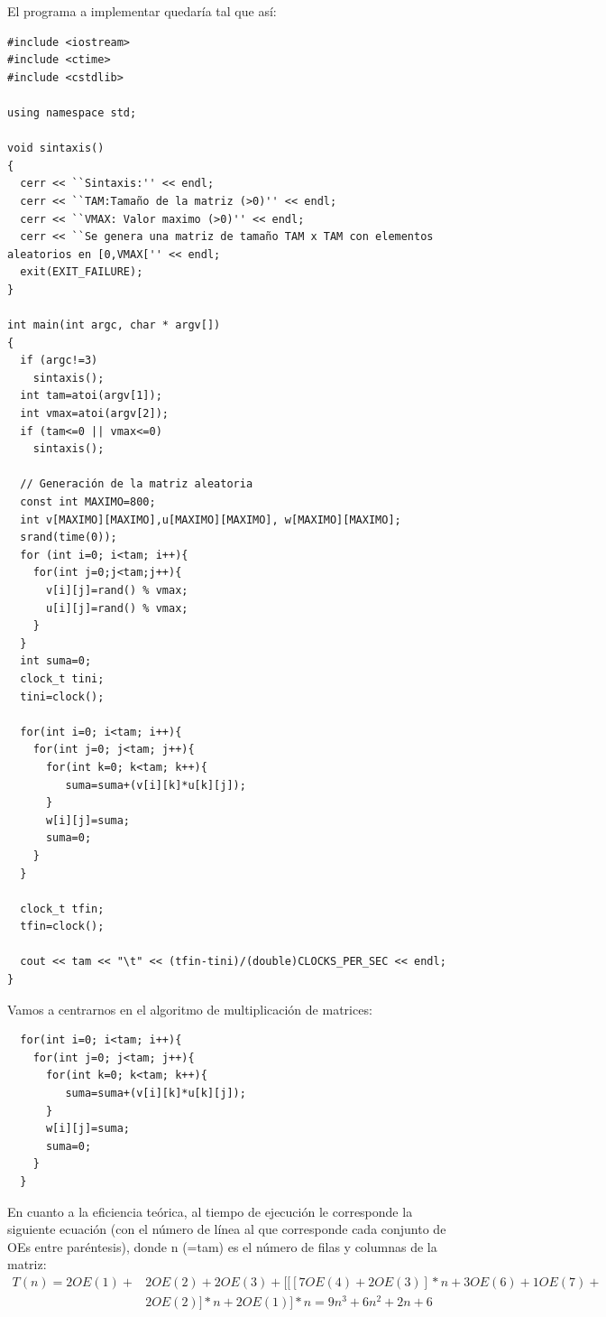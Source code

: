 \documentclass{article}
\begin{document}
El programa a implementar quedaría tal que así:
\begin{lstlisting}
#include <iostream>
#include <ctime>    
#include <cstdlib>  

using namespace std;

void sintaxis()
{
  cerr << ``Sintaxis:'' << endl;
  cerr << ``TAM:Tamaño de la matriz (>0)'' << endl;
  cerr << ``VMAX: Valor maximo (>0)'' << endl;
  cerr << ``Se genera una matriz de tamaño TAM x TAM con elementos aleatorios en [0,VMAX['' << endl;
  exit(EXIT_FAILURE);
}

int main(int argc, char * argv[])
{
  if (argc!=3)
    sintaxis();
  int tam=atoi(argv[1]);     
  int vmax=atoi(argv[2]);    
  if (tam<=0 || vmax<=0)
    sintaxis();
  
  // Generación de la matriz aleatoria
  const int MAXIMO=800;
  int v[MAXIMO][MAXIMO],u[MAXIMO][MAXIMO], w[MAXIMO][MAXIMO];
  srand(time(0));            
  for (int i=0; i<tam; i++){
    for(int j=0;j<tam;j++){
      v[i][j]=rand() % vmax;  
      u[i][j]=rand() % vmax;
    }
  }
  int suma=0;
  clock_t tini;    
  tini=clock();
  
  for(int i=0; i<tam; i++){
    for(int j=0; j<tam; j++){
      for(int k=0; k<tam; k++){
         suma=suma+(v[i][k]*u[k][j]);
      }
      w[i][j]=suma;
      suma=0;
    }
  }

  clock_t tfin;    
  tfin=clock();

  cout << tam << "\t" << (tfin-tini)/(double)CLOCKS_PER_SEC << endl;
}
\end{lstlisting}
\clearpage
Vamos a centrarnos en el algoritmo de multiplicación de matrices:
\begin{lstlisting}
  for(int i=0; i<tam; i++){
    for(int j=0; j<tam; j++){
      for(int k=0; k<tam; k++){
         suma=suma+(v[i][k]*u[k][j]);
      }
      w[i][j]=suma;
      suma=0;
    }
  }
\end{lstlisting}
En cuanto a la eficiencia teórica, al tiempo de ejecución le corresponde la siguiente ecuación (con el número de línea al que corresponde cada conjunto de OEs entre paréntesis), donde n (=tam) es el número de filas y columnas de la matriz:
\begin{align*}
  T(n)= 2OE(1)+&2OE(2)+2OE(3)+[[[7OE(4)+2OE(3)]*n+3OE(6)+1OE(7)+\\&2OE(2)]*n+2OE(1)]*n = 9n^{3}+6n^{2}+2n+6
\end{align*}
\end{document}
